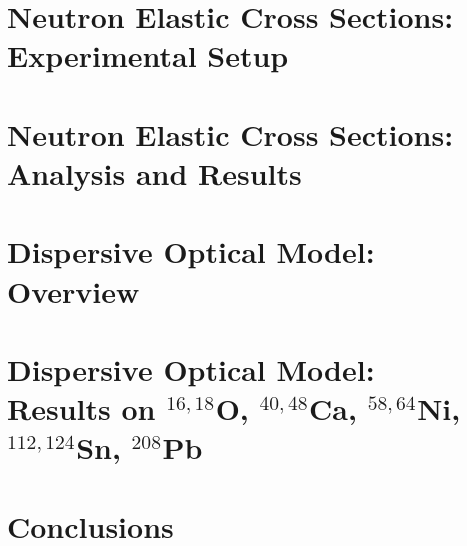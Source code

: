 \documentclass[12pt,twoside]{book} %
\newcommand{\oSixEight}{\ensuremath{^{16,18}}O}
\newcommand{\caAughtEight}{\ensuremath{^{40,48}}C\lowercase{a}}
\newcommand{\niEightFour}{\ensuremath{^{58,64}}N\lowercase{i}}
\newcommand{\snTwelveFour}{\ensuremath{^{112,124}}S\lowercase{n}}
\newcommand{\pbEight}{\ensuremath{^{208}}P\lowercase{b}}
\newcommand{\textDirectory}{text}
\begin{document}
\chapter{Neutron Elastic Cross Sections: Experimental Setup} \label{ECSExperiment}


\chapter{Neutron Elastic Cross Sections: Analysis and Results} \label{ECSAnalysis}


\chapter{Dispersive Optical Model: Overview} \label{DOMFormalism}


\chapter{Dispersive Optical Model:\protect\\ Results on \oSixEight, \caAughtEight,
\niEightFour, \snTwelveFour, \pbEight}\label{DOMResults}
%

\chapter{Conclusions}


\clearpage %

\fancyhead{} %
\fancyhead[LE]{\MakeUppercase{ \leftmark}} %

\clearpage
{}

\singlespacing


\doublespacing

\clearpage
\end{document}
